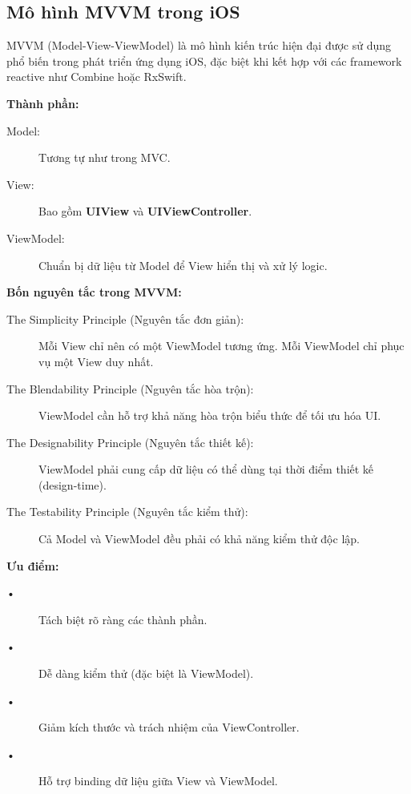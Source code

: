     \subsection{Mô hình MVVM trong iOS}

    MVVM (Model-View-ViewModel) là mô hình kiến trúc hiện đại được sử dụng phổ biến trong phát triển ứng dụng iOS, đặc biệt khi kết hợp với các framework reactive như Combine hoặc RxSwift.

    \vspace{1em}
    \textbf{Thành phần:}
    \begin{description}
    \item[Model:] Tương tự như trong MVC.
    \item[View:] Bao gồm \textbf{UIView} và \textbf{UIViewController}.
    \item[ViewModel:] Chuẩn bị dữ liệu từ Model để View hiển thị và xử lý logic.
    \end{description}

    \vspace{1em}
    \textbf{Bốn nguyên tắc trong MVVM:}
    \begin{description}
        \item[The Simplicity Principle (Nguyên tắc đơn giản):] Mỗi View chỉ nên có một ViewModel tương ứng. Mỗi ViewModel chỉ phục vụ một View duy nhất.
        \item[The Blendability Principle (Nguyên tắc hòa trộn):] ViewModel cần hỗ trợ khả năng hòa trộn biểu thức để tối ưu hóa UI.
        \item[The Designability Principle (Nguyên tắc thiết kế):] ViewModel phải cung cấp dữ liệu có thể dùng tại thời điểm thiết kế (design-time).
        \item[The Testability Principle (Nguyên tắc kiểm thử):] Cả Model và ViewModel đều phải có khả năng kiểm thử độc lập.
    \end{description}

    \vspace{1em}
    \textbf{Ưu điểm:}
    \begin{description}
    \item[•] Tách biệt rõ ràng các thành phần.
    \item[•] Dễ dàng kiểm thử (đặc biệt là ViewModel).
    \item[•] Giảm kích thước và trách nhiệm của ViewController.
    \item[•] Hỗ trợ binding dữ liệu giữa View và ViewModel.
    \end{description}

